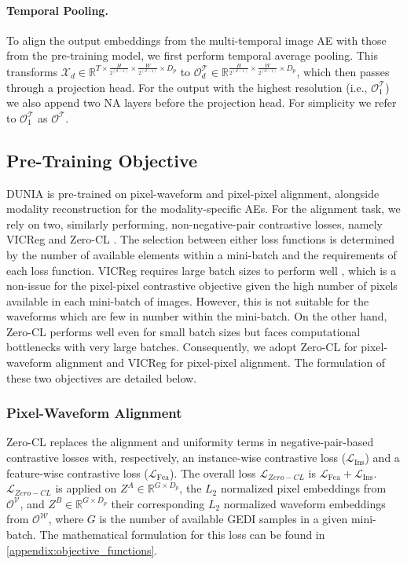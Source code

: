 \paragraph{Temporal Pooling.} To align the output embeddings from the multi-temporal image AE with those from the pre-training model, we first perform temporal average pooling. This transforms $\mathcal{X}_d \in \mathbb{R}^{T \times \frac{H}{2^{(d-1)}} \times \frac{W}{2^{(d-1)}} \times D_p}$ to $\mathcal{O}^\mathcal{T}_d\in \mathbb{R}^{\frac{H}{2^{(d-1)}} \times \frac{W}{2^{(d-1)}} \times D_p}$, which then passes through a projection head. For the output with the highest resolution (i.e., $\mathcal{O}^\mathcal{T}_1$) we also append two NA layers before the projection head.  For simplicity we refer to $\mathcal{O}^\mathcal{T}_1$ as $\mathcal{O^T}$.

\subsection{Pre-Training Objective}\label{se:pretraining_objective}

DUNIA is pre-trained on pixel-waveform and pixel-pixel alignment, alongside modality reconstruction for the modality-specific AEs. For the alignment task, we rely on two, similarly performing, non-negative-pair contrastive losses, namely VICReg \cite{bardes2021vicreg} and Zero-CL \cite{Zhang_etal_2021}. The selection between either loss functions is determined by the number of available elements within a mini-batch and the requirements of each loss function. VICReg requires large batch sizes to perform well \cite{bardes2021vicreg}, which is a non-issue for the pixel-pixel contrastive objective given the high number of pixels available in each mini-batch of images. However, this is not suitable for the waveforms which are few in number within the mini-batch. On the other hand, Zero-CL performs well even for small batch sizes but faces computational bottlenecks with very large batches. Consequently, we adopt Zero-CL for pixel-waveform alignment and VICReg for pixel-pixel alignment. The formulation of these two objectives are detailed below.

\subsubsection{Pixel-Waveform Alignment} Zero-CL replaces the alignment and uniformity terms in negative-pair-based contrastive losses \cite{Arora_etal_2019} with, respectively, an instance-wise contrastive loss ($\mathcal{L}_{\text{Ins}}$) and a feature-wise contrastive loss ($\mathcal{L}_{\text{Fea}}$). The overall loss $\mathcal{L}_{Zero-CL}$ is $\mathcal{L}_{\text{Fea}} + \mathcal{L}_{\text{Ins}}$. $\mathcal{L}_{Zero-CL}$ is applied on \( Z^A \in \mathbb{R}^{G\times D_p} \), the $L_2$ normalized pixel embeddings from $\mathcal{O}^\mathcal{V}$, and \( Z^B \in \mathbb{R}^{G \times D_p} \) their corresponding $L_2$ normalized waveform embeddings from $\mathcal{O}^\mathcal{W}$, where \( G \) is the number of available GEDI samples in a given mini-batch. The mathematical formulation for this loss can be found in \autoref{appendix:objective_functions}.

